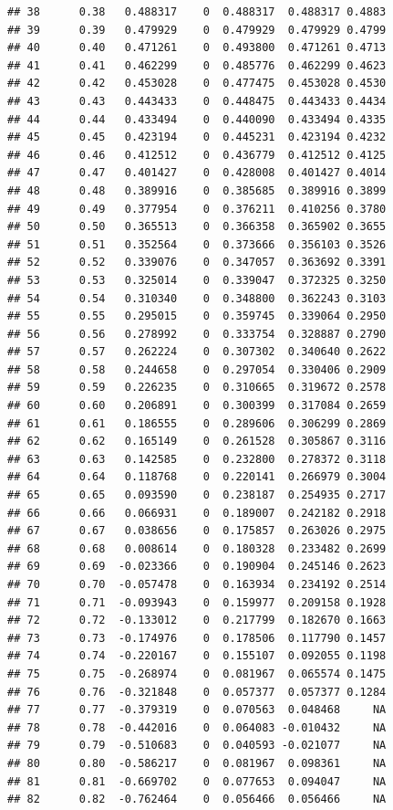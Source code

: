 \documentclass{article}\usepackage[]{graphicx}\usepackage[]{color}
\makeatletter
\newenvironment{kframe}{%
 \def\at@end@of@kframe{}%
 \ifinner\ifhmode%
  \def\at@end@of@kframe{\end{minipage}}%
  \begin{minipage}{\columnwidth}%
 \fi\fi%
 \def\FrameCommand##1{\hskip\@totalleftmargin \hskip-\fboxsep
 \colorbox{shadecolor}{##1}\hskip-\fboxsep
     \hskip-\linewidth \hskip-\@totalleftmargin \hskip\columnwidth}%
 \MakeFramed {\advance\hsize-\width
   \@totalleftmargin\z@ \linewidth\hsize
   \@setminipage}}%
 {\par\unskip\endMakeFramed%
 \at@end@of@kframe}
\newenvironment{knitrout}{}{} %
\makeatother
\begin{document}
\begin{knitrout}
\begin{kframe}
\begin{verbatim}
## 38      0.38   0.488317    0  0.488317  0.488317 0.4883
## 39      0.39   0.479929    0  0.479929  0.479929 0.4799
## 40      0.40   0.471261    0  0.493800  0.471261 0.4713
## 41      0.41   0.462299    0  0.485776  0.462299 0.4623
## 42      0.42   0.453028    0  0.477475  0.453028 0.4530
## 43      0.43   0.443433    0  0.448475  0.443433 0.4434
## 44      0.44   0.433494    0  0.440090  0.433494 0.4335
## 45      0.45   0.423194    0  0.445231  0.423194 0.4232
## 46      0.46   0.412512    0  0.436779  0.412512 0.4125
## 47      0.47   0.401427    0  0.428008  0.401427 0.4014
## 48      0.48   0.389916    0  0.385685  0.389916 0.3899
## 49      0.49   0.377954    0  0.376211  0.410256 0.3780
## 50      0.50   0.365513    0  0.366358  0.365902 0.3655
## 51      0.51   0.352564    0  0.373666  0.356103 0.3526
## 52      0.52   0.339076    0  0.347057  0.363692 0.3391
## 53      0.53   0.325014    0  0.339047  0.372325 0.3250
## 54      0.54   0.310340    0  0.348800  0.362243 0.3103
## 55      0.55   0.295015    0  0.359745  0.339064 0.2950
## 56      0.56   0.278992    0  0.333754  0.328887 0.2790
## 57      0.57   0.262224    0  0.307302  0.340640 0.2622
## 58      0.58   0.244658    0  0.297054  0.330406 0.2909
## 59      0.59   0.226235    0  0.310665  0.319672 0.2578
## 60      0.60   0.206891    0  0.300399  0.317084 0.2659
## 61      0.61   0.186555    0  0.289606  0.306299 0.2869
## 62      0.62   0.165149    0  0.261528  0.305867 0.3116
## 63      0.63   0.142585    0  0.232800  0.278372 0.3118
## 64      0.64   0.118768    0  0.220141  0.266979 0.3004
## 65      0.65   0.093590    0  0.238187  0.254935 0.2717
## 66      0.66   0.066931    0  0.189007  0.242182 0.2918
## 67      0.67   0.038656    0  0.175857  0.263026 0.2975
## 68      0.68   0.008614    0  0.180328  0.233482 0.2699
## 69      0.69  -0.023366    0  0.190904  0.245146 0.2623
## 70      0.70  -0.057478    0  0.163934  0.234192 0.2514
## 71      0.71  -0.093943    0  0.159977  0.209158 0.1928
## 72      0.72  -0.133012    0  0.217799  0.182670 0.1663
## 73      0.73  -0.174976    0  0.178506  0.117790 0.1457
## 74      0.74  -0.220167    0  0.155107  0.092055 0.1198
## 75      0.75  -0.268974    0  0.081967  0.065574 0.1475
## 76      0.76  -0.321848    0  0.057377  0.057377 0.1284
## 77      0.77  -0.379319    0  0.070563  0.048468     NA
## 78      0.78  -0.442016    0  0.064083 -0.010432     NA
## 79      0.79  -0.510683    0  0.040593 -0.021077     NA
## 80      0.80  -0.586217    0  0.081967  0.098361     NA
## 81      0.81  -0.669702    0  0.077653  0.094047     NA
## 82      0.82  -0.762464    0  0.056466  0.056466     NA

\end{verbatim}
\end{kframe}
\end{knitrout}
\end{document}
